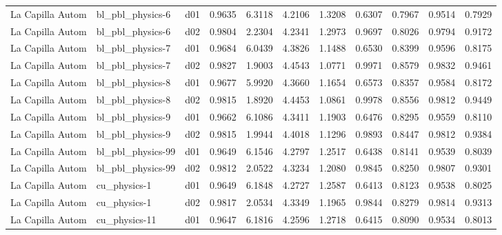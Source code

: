 \begin{longtable}{lllrrrrrrrr}
     La Capilla Autom  &      bl\_pbl\_physics-6 &     d01 &   0.9635 &   6.3118 &   4.2106 &       1.3208 &        0.6307 &       0.7967 &           0.9514 &  0.7929 \\
     La Capilla Autom  &      bl\_pbl\_physics-6 &     d02 &   0.9804 &   2.2304 &   4.2341 &       1.2973 &        0.9697 &       0.8026 &           0.9794 &  0.9172 \\
     La Capilla Autom  &      bl\_pbl\_physics-7 &     d01 &   0.9684 &   6.0439 &   4.3826 &       1.1488 &        0.6530 &       0.8399 &           0.9596 &  0.8175 \\
     La Capilla Autom  &      bl\_pbl\_physics-7 &     d02 &   0.9827 &   1.9003 &   4.4543 &       1.0771 &        0.9971 &       0.8579 &           0.9832 &  0.9461 \\
     La Capilla Autom  &      bl\_pbl\_physics-8 &     d01 &   0.9677 &   5.9920 &   4.3660 &       1.1654 &        0.6573 &       0.8357 &           0.9584 &  0.8172 \\
     La Capilla Autom  &      bl\_pbl\_physics-8 &     d02 &   0.9815 &   1.8920 &   4.4453 &       1.0861 &        0.9978 &       0.8556 &           0.9812 &  0.9449 \\
     La Capilla Autom  &      bl\_pbl\_physics-9 &     d01 &   0.9662 &   6.1086 &   4.3411 &       1.1903 &        0.6476 &       0.8295 &           0.9559 &  0.8110 \\
     La Capilla Autom  &      bl\_pbl\_physics-9 &     d02 &   0.9815 &   1.9944 &   4.4018 &       1.1296 &        0.9893 &       0.8447 &           0.9812 &  0.9384 \\
     La Capilla Autom  &     bl\_pbl\_physics-99 &     d01 &   0.9649 &   6.1546 &   4.2797 &       1.2517 &        0.6438 &       0.8141 &           0.9539 &  0.8039 \\
     La Capilla Autom  &     bl\_pbl\_physics-99 &     d02 &   0.9812 &   2.0522 &   4.3234 &       1.2080 &        0.9845 &       0.8250 &           0.9807 &  0.9301 \\
     La Capilla Autom  &          cu\_physics-1 &     d01 &   0.9649 &   6.1848 &   4.2727 &       1.2587 &        0.6413 &       0.8123 &           0.9538 &  0.8025 \\
     La Capilla Autom  &          cu\_physics-1 &     d02 &   0.9817 &   2.0534 &   4.3349 &       1.1965 &        0.9844 &       0.8279 &           0.9814 &  0.9313 \\
     La Capilla Autom  &         cu\_physics-11 &     d01 &   0.9647 &   6.1816 &   4.2596 &       1.2718 &        0.6415 &       0.8090 &           0.9534 &  0.8013 \\

\end{longtable}
